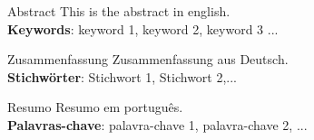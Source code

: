 \documentclass{apaThesis}
\begin{document}
\cleardoublepage



\begin{newabstract}{Abstract}
	This is the abstract in english. \\
\noindent
\textbf{Keywords}: keyword 1, keyword 2, keyword 3 ...
\end{newabstract}

\begin{newabstract}{Zusammenfassung}
Zusammenfassung aus Deutsch. \\

\noindent
\textbf{Stichwörter}: Stichwort 1, Stichwort 2,...
\end{newabstract}

\begin{newabstract}{Resumo}
	Resumo em português. \\
\noindent
\textbf{Palavras-chave}: palavra-chave 1, palavra-chave 2, ...
\end{newabstract}


\listoffigures
\cleardoublepage

\listoftables
\cleardoublepage

\end{document}
